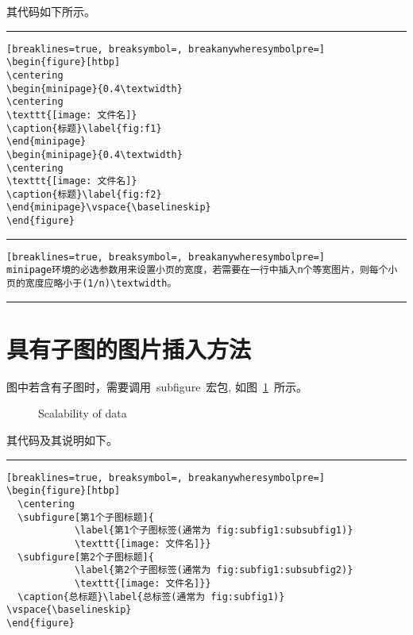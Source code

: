 其代码如下所示。
\vspace{1em}\noindent\hrule
\begin{Verbatim}[breaklines=true, breaksymbol=, breakanywheresymbolpre=]
\begin{figure}[htbp]
\centering
\begin{minipage}{0.4\textwidth}
\centering
\texttt{[image: 文件名]}
\caption{标题}\label{fig:f1}
\end{minipage}
\begin{minipage}{0.4\textwidth}
\centering
\texttt{[image: 文件名]}
\caption{标题}\label{fig:f2}
\end{minipage}\vspace{\baselineskip}
\end{figure}
\end{Verbatim}

\noindent\hrule

\begin{Verbatim}[breaklines=true, breaksymbol=, breakanywheresymbolpre=]
minipage环境的必选参数用来设置小页的宽度，若需要在一行中插入n个等宽图片，则每个小页的宽度应略小于(1/n)\textwidth。
\end{Verbatim}

\noindent\hrule

\section{具有子图的图片插入方法}

图中若含有子图时，需要调用~subfigure~宏包, 如图~\ref{fig:subfig}~所示。
\begin{figure}[htbp]
  \centering
  \caption{Scalability of data}\label{fig:subfig}
\vspace{\baselineskip}
\end{figure}

其代码及其说明如下。
\vspace{1em}\noindent\hrule

\begin{Verbatim}[breaklines=true, breaksymbol=, breakanywheresymbolpre=]
\begin{figure}[htbp]
  \centering
  \subfigure[第1个子图标题]{
            \label{第1个子图标签(通常为 fig:subfig1:subsubfig1)}
            \texttt{[image: 文件名]}}
  \subfigure[第2个子图标题]{
            \label{第2个子图标签(通常为 fig:subfig1:subsubfig2)}
            \texttt{[image: 文件名]}}
  \caption{总标题}\label{总标签(通常为 fig:subfig1)}
\vspace{\baselineskip}
\end{figure}
\end{Verbatim}

